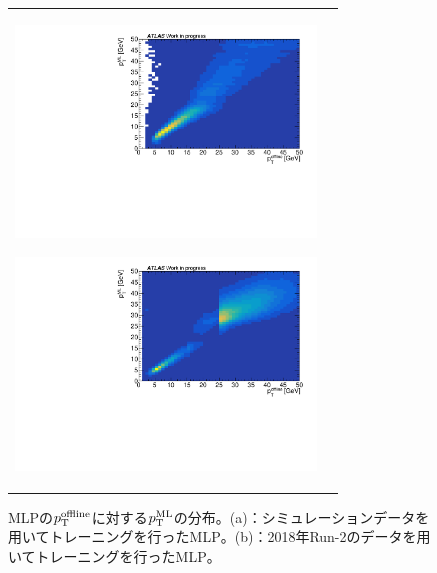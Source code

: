 \begin{figure}
    \begin{tabular}{cc}
    \centering
    \begin{minipage}[b]{0.45\hsize}%
        \centering
        \hspace*{-1.5cm}
        \includegraphics[clip, width=8cm]{fig/4/MC_pred_true_25.pdf}
        \subcaption{}
        \label{fig:zannsa_25_MC}
    \end{minipage}%
    \begin{minipage}[b]{0.65\hsize}%
        \centering
        \hspace*{-1cm}
        \includegraphics[clip, width=8cm]{fig/4/pred_true_25_v1.pdf}
        \subcaption{}
        \label{fig:zannsa_25_Data}
    \end{minipage}%
    \end{tabular}
    \caption{MLPの$p_{\rm{T}}^{\rm{offline}}$に対する$p_{\rm{T}}^{\rm{ML}}$の分布。(a)：シミュレーションデータを用いてトレーニングを行ったMLP。(b)：2018年Run-2のデータを用いてトレーニングを行ったMLP。}
    \label{25}
\end{figure}





